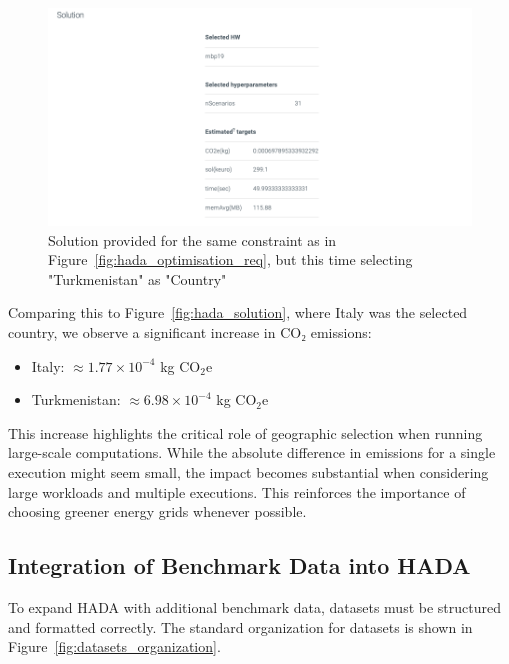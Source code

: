 \documentclass[a4paper,singleside,12pt]{report} %
\begin{document}
\begin{figure}[h!]
    \centering
    \includegraphics[width=\textwidth]{imgs/hada-solution-turkmenistan.png}
    \caption{Solution provided for the same constraint as in Figure~\ref{fig:hada_optimisation_req}, but this time selecting "Turkmenistan" as "Country"}
    \label{fig:hada_solution_turkmenistan}
\end{figure}

Comparing this to Figure~\ref{fig:hada_solution}, where Italy was the selected country, we observe a significant increase in CO₂ emissions:

\begin{itemize}
    \item Italy: $\approx 1.77 \times 10^{-4}$ kg CO$_2$e
    \item Turkmenistan: $\approx 6.98 \times 10^{-4}$ kg CO$_2$e
\end{itemize}

This increase highlights the critical role of geographic selection when running large-scale computations. While the absolute difference in emissions for a single execution might seem 
small, the impact becomes substantial when considering large workloads and multiple executions. This reinforces the importance of choosing greener energy grids whenever possible.

\subsection{Integration of Benchmark Data into HADA}

To expand HADA with additional benchmark data, datasets must be structured and formatted correctly. The standard organization for datasets is shown in Figure~\ref{fig:datasets_organization}.
\end{document}
